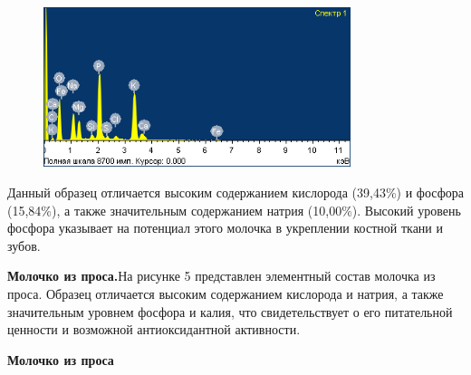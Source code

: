 \begin{figure}[H]
	\centering
	\includegraphics[width=0.8\textwidth]{media/pish/image50}
	\caption*{}
\end{figure}
Данный
образец отличается высоким содержанием кислорода (39,43\%) и фосфора
(15,84\%), а также значительным содержанием натрия (10,00\%). Высокий
уровень фосфора указывает на потенциал этого молочка в укреплении
костной ткани и зубов.

{\bfseries Молочко из проса.}На рисунке 5 представлен элементный состав
молочка из проса. Образец отличается высоким содержанием кислорода и
натрия, а также значительным уровнем фосфора и калия, что
свидетельствует о его питательной ценности и возможной антиоксидантной
активности.

{\bfseries Молочко из проса}




